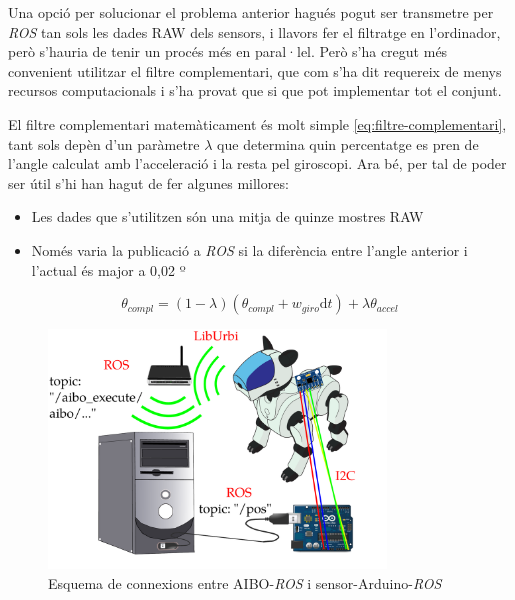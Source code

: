 \documentclass[12pt,a4paper,final,twoside]{article}
\begin{document}
Una opció per solucionar el problema anterior hagués pogut ser transmetre per \textit{ROS} tan sols les dades RAW dels sensors, i llavors fer el filtratge en l'ordinador, però s'hauria de tenir un procés més en paral·lel. Però s'ha cregut més convenient utilitzar el filtre complementari, que com s'ha dit requereix de menys recursos computacionals i s'ha provat que si que pot implementar tot el conjunt.

El filtre complementari matemàticament és molt simple \eqref{eq:filtre-complementari}, tant sols depèn d'un paràmetre $\lambda$ que determina quin percentatge es pren de l'angle calculat amb l'acceleració i la resta pel giroscopi. Ara bé, per tal de poder ser útil s'hi han hagut de fer algunes millores:

\begin{itemize}
\item Les dades que s'utilitzen són una mitja de quinze mostres RAW
\item Només varia la publicació a \textit{ROS} si la diferència entre l'angle anterior i l'actual és major a 0,02 º
\end{itemize}

\begin{equation} 
\theta_{compl} = (1 - \lambda)(\theta_{compl} + w_{giro}\mathrm{d}t) + \lambda \theta_{accel} \label{eq:filtre-complementari}
\end{equation}

\begin{figure}[tb]
\centering
\includegraphics[width=0.8\textwidth]{Imatges/esquema-comunicacio-ROS-Aibo-ordenadora.pdf}
\caption{Esquema de connexions entre AIBO-\textit{ROS} i sensor-Arduino-\textit{ROS}}
\label{fig:connexions-Aibo-ROS-sensor-Arduino-ROS}
\end{figure}
\end{document}
